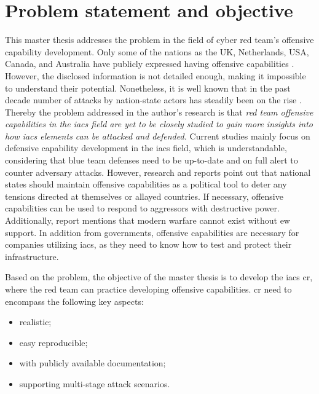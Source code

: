 \section{Problem statement and objective}

This master thesis addresses the problem in the field of cyber red team's offensive capability development. Only some of the nations as the UK, Netherlands, USA, Canada, and Australia have publicly expressed having offensive capabilities \parencite{94-nation-offensive-capabilities-ccdco, 91-netherlands-cyber-ofensive-capabiliteis, 92-UK-cyber-offensive}. However, the disclosed information is not detailed enough, making it impossible to understand their potential. Nonetheless, it is well known that in the past decade number of attacks by nation-state actors has steadily been on the rise \parencite{67-kaspersky-threat-landscape-for-industrial-automation-systems-statistics-for-h2-2020-en}. Thereby the problem addressed in the author's research is that \textit{red team offensive capabilities in the \gls*{iacs} field are yet to be closely studied to gain more insights into how \gls*{iacs} elements can be attacked and defended.} Current studies mainly focus on defensive capability development in the \gls*{iacs} field, which is understandable, considering that blue team defenses need to be up-to-date and on full alert to counter adversary attacks. However, research and reports point out that national states should maintain offensive capabilities as a political tool to deter any tensions directed at themselves or allayed countries. If necessary, offensive capabilities can be used to respond to aggressors with destructive power. Additionally, report   \parencite{53-NATO-role-of-offensi-cyber-capabilities} mentions that modern warfare cannot exist without \gls*{ew} support. In addition from governments, offensive capabilities are necessary for companies utilizing \gls*{iacs}, as they need to know how to test and protect their infrastructure.

Based on the problem, the objective of the master thesis is to develop the \gls*{iacs} \gls*{cr}, where the red team can practice developing offensive capabilities. \gls*{cr} need to encompass the following key aspects:

\begin{itemize}
	\item realistic;
	\item easy reproducible;
	\item with publicly available documentation;
	\item supporting multi-stage attack scenarios.
\end{itemize}

